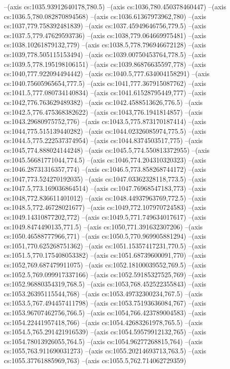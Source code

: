 --(axis cs:1035.93912640178,780.5)
--(axis cs:1036,780.450378460447)
--(axis cs:1036.5,780.082870894568)
--(axis cs:1036.61367973962,780)
--(axis cs:1037,779.758392481839)
--(axis cs:1037.45949646756,779.5)
--(axis cs:1037.5,779.47629593736)
--(axis cs:1038,779.064669975481)
--(axis cs:1038.10261879132,779)
--(axis cs:1038.5,778.796946672128)
--(axis cs:1039,778.505115153494)
--(axis cs:1039.00750453764,778.5)
--(axis cs:1039.5,778.195198106151)
--(axis cs:1039.86876635597,778)
--(axis cs:1040,777.922094494442)
--(axis cs:1040.5,777.634004158291)
--(axis cs:1040.75605965654,777.5)
--(axis cs:1041,777.367915087762)
--(axis cs:1041.5,777.080734140834)
--(axis cs:1041.61528795449,777)
--(axis cs:1042,776.763629489382)
--(axis cs:1042.4588513626,776.5)
--(axis cs:1042.5,776.475368382622)
--(axis cs:1043,776.1941814857)
--(axis cs:1043.29680975752,776)
--(axis cs:1043.5,775.873170187414)
--(axis cs:1044,775.515139440282)
--(axis cs:1044.02326085974,775.5)
--(axis cs:1044.5,775.222537374954)
--(axis cs:1044.8374503517,775)
--(axis cs:1045,774.888024144248)
--(axis cs:1045.5,774.550813372955)
--(axis cs:1045.56681771044,774.5)
--(axis cs:1046,774.204310320323)
--(axis cs:1046.28731316357,774)
--(axis cs:1046.5,773.858268744172)
--(axis cs:1047,773.524270192035)
--(axis cs:1047.03362328118,773.5)
--(axis cs:1047.5,773.169036864514)
--(axis cs:1047.76968547183,773)
--(axis cs:1048,772.836611401012)
--(axis cs:1048.44937963769,772.5)
--(axis cs:1048.5,772.46728021677)
--(axis cs:1049,772.107970724583)
--(axis cs:1049.14310877202,772)
--(axis cs:1049.5,771.749634017617)
--(axis cs:1049.8474490135,771.5)
--(axis cs:1050,771.391632307206)
--(axis cs:1050.46588777966,771)
--(axis cs:1050.5,770.969905881294)
--(axis cs:1051,770.625268751362)
--(axis cs:1051.15357417231,770.5)
--(axis cs:1051.5,770.175408053382)
--(axis cs:1051.68739600091,770)
--(axis cs:1052,769.687479911075)
--(axis cs:1052.18100039552,769.5)
--(axis cs:1052.5,769.099917337166)
--(axis cs:1052.59185327525,769)
--(axis cs:1052.96880354319,768.5)
--(axis cs:1053,768.452522355843)
--(axis cs:1053.26395115544,768)
--(axis cs:1053.49732300234,767.5)
--(axis cs:1053.5,767.494457411798)
--(axis cs:1053.75193636084,767)
--(axis cs:1053.96707462756,766.5)
--(axis cs:1054,766.423789004583)
--(axis cs:1054.22441957418,766)
--(axis cs:1054.42683261978,765.5)
--(axis cs:1054.5,765.291421916539)
--(axis cs:1054.59579912132,765)
--(axis cs:1054.78013926055,764.5)
--(axis cs:1054.96277268815,764)
--(axis cs:1055,763.911690031273)
--(axis cs:1055.20214693713,763.5)
--(axis cs:1055.37761885969,763)
--(axis cs:1055.5,762.714062729359)
